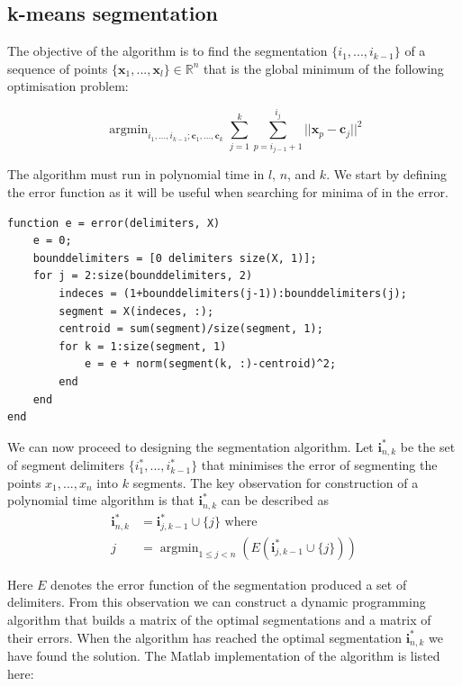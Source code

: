 \documentclass[11pt]{article}
\DeclareMathOperator*{\argmin}{argmin}
\begin{document}
\subsection{k-means segmentation}

    The objective of the algorithm is to find the segmentation $\{i_1, ..., i_{k-1}\}$ of a sequence of points $\{\mathbf{x}_1, ..., \mathbf{x}_l\} \in \mathbb{R}^n$ that is the global minimum of the following optimisation problem:
    
    \begin{equation}
        \argmin_{i_1, ..., i_{k-1}; \mathbf{c}_1, ..., \mathbf{c}_k} \sum_{j=1}^k \sum_{p=i_{j-1} + 1}^{i_j} ||\mathbf{x}_p - \mathbf{c}_j ||^2
    \end{equation}
    
    The algorithm must run in polynomial time in $l$, $n$, and $k$. We start by defining the error function as it will be useful when searching for minima of in the error.
    
    \begin{lstlisting}
function e = error(delimiters, X)
    e = 0;
    bounddelimiters = [0 delimiters size(X, 1)];
    for j = 2:size(bounddelimiters, 2)
        indeces = (1+bounddelimiters(j-1)):bounddelimiters(j);
        segment = X(indeces, :);
        centroid = sum(segment)/size(segment, 1);
        for k = 1:size(segment, 1)
            e = e + norm(segment(k, :)-centroid)^2;
        end
    end
end\end{lstlisting}
    
    We can now proceed to designing  the segmentation algorithm. 
    Let $\mathbf{i}^*_{n, k}$ be the set of segment delimiters $\{ i^*_1, ..., i^*_{k-1} \}$ that minimises the error of segmenting the points $x_1, ..., x_n$ into $k$ segments. The key observation for construction of a polynomial time algorithm is that $\mathbf{i}^*_{n,k}$ can be described as
    \begin{equation}
    \begin{split}
        \mathbf{i}^*_{n,k} &= \mathbf{i}^*_{j, k-1} \cup \{ j \} \text{ where } \\
        j &= \argmin_{1 \leq j < n} (E(\mathbf{i}^*_{j, k-1} \cup \{ j \} ))
    \end{split}
    \end{equation}
    
    Here $E$ denotes the error function of the segmentation produced a set of delimiters. From this observation we can construct a dynamic programming algorithm that builds a matrix of the optimal segmentations and a matrix of their errors. When the algorithm has reached the optimal segmentation $\mathbf{i}^*_{n,k}$ we have found the solution. The Matlab implementation of the algorithm is listed here:
    
\end{document}
